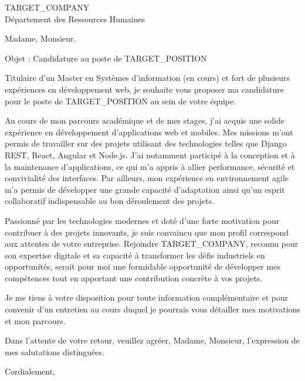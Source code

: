 \documentclass[a4paper,11pt]{letter}
\date{\today}
\begin{document}
\begin{letter}{{TARGET_COMPANY}\\ Département des Ressources Humaines}
  
\opening{Madame, Monsieur,}

Objet : Candidature au poste de {TARGET_POSITION}

Titulaire d'un Master en Systèmes d'information (en cours) et fort de plusieurs expériences en développement web, je souhaite vous proposer ma candidature pour le poste de {TARGET_POSITION} au sein de votre équipe.

Au cours de mon parcours académique et de mes stages, j'ai acquis une solide expérience en développement d'applications web et mobiles. Mes missions m'ont permis de travailler sur des projets utilisant des technologies telles que Django REST, React, Angular et Node.js. J'ai notamment participé à la conception et à la maintenance d'applications, ce qui m'a appris à allier performance, sécurité et convivialité des interfaces. Par ailleurs, mon expérience en environnement agile m'a permis de développer une grande capacité d'adaptation ainsi qu'un esprit collaboratif indispensable au bon déroulement des projets.

Passionné par les technologies modernes et doté d'une forte motivation pour contribuer à des projets innovants, je suis convaincu que mon profil correspond aux attentes de votre entreprise. Rejoindre {TARGET_COMPANY}, reconnu pour son expertise digitale et sa capacité à transformer les défis industriels en opportunités, serait pour moi une formidable opportunité de développer mes compétences tout en apportant une contribution concrète à vos projets.

Je me tiens à votre disposition pour toute information complémentaire et pour convenir d'un entretien au cours duquel je pourrais vous détailler mes motivations et mon parcours.

Dans l'attente de votre retour, veuillez agréer, Madame, Monsieur, l'expression de mes salutations distinguées.

\closing{Cordialement,}

\end{letter}
\end{document}
